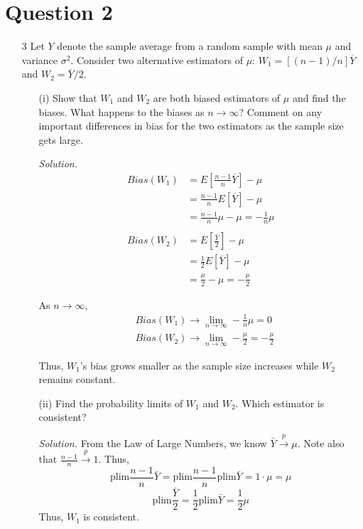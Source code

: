\documentclass[
]{article}
\begin{document}
\hypertarget{question-2}{%
\section{Question 2}\label{question-2}}

\begin{enumerate} 
\item[3] Let $Y$ denote the sample average from a random sample with mean $\mu$ and variance $\sigma^2$. Consider two alternative estimators of $\mu$: $W_1 = [(n-1)/n]\overline{Y}$ and $W_2 = \overline{Y} / 2$. 
\begin{enumerate} 
\item[(i)] Show that $W_1$ and $W_2$ are both biased estimators of $\mu$ and find the biases. What happens to the biases as $n \to \infty$? Comment on any important differences in bias for the two estimators as the sample size gets large.  
  
\textit{Solution.} 
\[\begin{aligned}
Bias(W_1) &= E[\frac{n-1}{n} \overline{Y}] - \mu \\
&= \frac{n-1}{n} E[\overline{Y}] - \mu \\
&= \frac{n-1}{n} \mu - \mu = -\frac{1}{n} \mu \\
 \\
 Bias(W_2) &= E[\frac{\overline{Y}}{2}] - \mu \\
 &= \frac{1}{2}E[\overline{Y}] - \mu \\
 &= \frac{\mu}{2} - \mu = -\frac{\mu}{2}
\end{aligned}\]

As $n \to \infty$, 
\[\begin{aligned} 
&Bias(W_1) \to \lim_ {n \to \infty} -\frac{1}{n} \mu = 0 \\
&Bias(W_2) \to \lim_{n \to \infty} -\frac{\mu}{2} = -\frac{\mu}{2}
\end{aligned}\]

Thus, $W_1$'s bias grows smaller as the sample size increases while $W_2$ remains constant. 

\item[(ii)] Find the probability limits of $W_1$ and $W_2$. Which estimator is consistent?  
  
\textit{Solution.} From the Law of Large Numbers, we know $\bar{Y} \stackrel{p}{\to} \mu$. Note also that $\frac{n-1}{n} \stackrel{p}{\to} 1$. Thus, 
\[\text{plim}\frac{n-1}{n}\bar{Y} = \text{plim}\frac{n-1}{n} \text{plim}\bar{Y} = 1 \cdot \mu = \mu\]
\[\text{plim}\frac{\bar{Y}}{2} = \frac{1}{2} \text{plim}\bar{Y} = \frac{1}{2} \mu\]
Thus, $W_1$ is consistent. 


\end{enumerate}
\end{enumerate}
\end{document}
